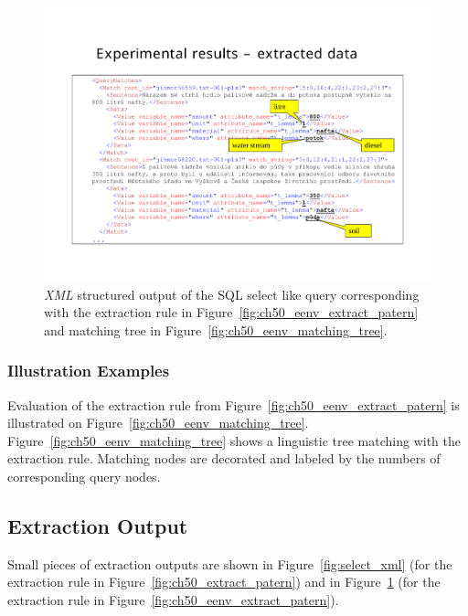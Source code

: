 \begin{figure}
	\centering
		\includegraphics[angle=-90, width=0.7\hsize]{eenv_results}
	\caption{\emph{XML} structured output of the SQL select like query corresponding with the extraction rule in Figure~\ref{fig:ch50_eenv_extract_patern} and matching tree in Figure~\ref{fig:ch50_eenv_matching_tree}.}
	\label{fig:ch50_eenv_results}
\end{figure}























\subsubsection{Illustration Examples}



Evaluation of the extraction rule from Figure~\ref{fig:ch50_eenv_extract_patern} is illustrated on Figure~\ref{fig:ch50_eenv_matching_tree}. Figure~\ref{fig:ch50_eenv_matching_tree} shows a linguistic tree matching with the extraction rule. Matching nodes are decorated and labeled by the numbers of corresponding query nodes.



\subsection{Extraction Output} \label{sec:impl_manual_output}

Small pieces of extraction outputs are shown in Figure~\ref{fig:select_xml} (for the extraction rule in Figure~\ref{fig:ch50_extract_patern}) and in Figure~\ref{fig:ch50_eenv_results} (for the extraction rule in Figure~\ref{fig:ch50_eenv_extract_patern}). 

